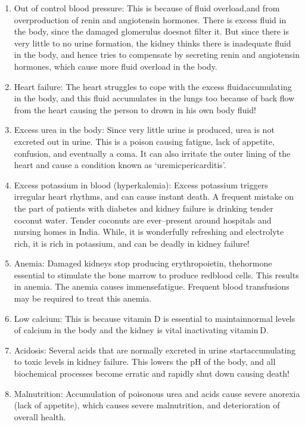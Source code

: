 \vspace{-\topsep}
\begin{enumerate}[•]
\itemsep=0pt
\item Out of control blood pressure: This is because of fluid overload,\break and from overproduction of renin and angiotensin hormones. There is excess fluid in the body, since the damaged glomerulus does\break not filter it. But since there is very little to no urine formation, the kidney thinks there is inadequate fluid in the body, and hence tries to compensate by secreting renin and angiotensin hormones, which cause more fluid overload in the body.
\item Heart failure: The heart struggles to cope with the excess fluid\break accumulating in the body, and this fluid accumulates in the lungs too because of back flow from the heart causing the person to drown in his own body fluid!
\item Excess urea in the body: Since very little urine is produced, urea is not excreted out in urine. This is a poison causing fatigue, lack of appetite, confusion, and eventually a coma. It can also irritate the outer lining of the heart and cause a condition known as ‘uremic\break pericarditis’.
\item Excess potassium in blood (hyperkalemia): Excess potassium triggers irregular heart rhythms, and can cause instant death. A frequent mistake on the part of patients with diabetes and kidney failure is drinking tender coconut water. Tender coconuts are ever–present around hospitals and nursing homes in India. While, it is wonderfully refreshing and electrolyte rich, it is rich in potassium, and can be deadly in kidney failure!
\item Anemia: Damaged kidneys stop producing erythropoietin, the\break hormone essential to stimulate the bone marrow to produce red\break blood cells. This results in anemia. The anemia causes immense\break fatigue. Frequent blood transfusions may be required to treat this anemia.
\item Low calcium: This is because vitamin D is essential to maintain\break normal levels of calcium in the body and the kidney is vital in\break activating vitamin D.
\item Acidosis: Several acids that are normally excreted in urine start\break accumulating to toxic levels in kidney failure. This lowers the pH of the body, and all biochemical processes become erratic and rapidly shut down causing death!
\item Malnutrition: Accumulation of poisonous urea and acids cause severe anorexia (lack of appetite), which causes severe malnutrition, and deterioration of overall health.
\end{enumerate}
\vspace{-\topsep}


